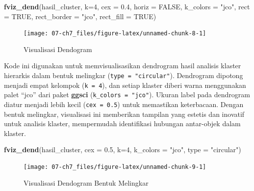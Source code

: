 \documentclass[
  oneside]{book}
\newenvironment{Shaded}{\begin{snugshade}}{\end{snugshade}}
\newcommand{\AttributeTok}[1]{\textcolor[rgb]{0.13,0.29,0.53}{#1}}
\newcommand{\ConstantTok}[1]{\textcolor[rgb]{0.56,0.35,0.01}{#1}}
\newcommand{\DecValTok}[1]{\textcolor[rgb]{0.00,0.00,0.81}{#1}}
\newcommand{\FloatTok}[1]{\textcolor[rgb]{0.00,0.00,0.81}{#1}}
\newcommand{\FunctionTok}[1]{\textcolor[rgb]{0.13,0.29,0.53}{\textbf{#1}}}
\newcommand{\NormalTok}[1]{#1}
\newcommand{\StringTok}[1]{\textcolor[rgb]{0.31,0.60,0.02}{#1}}
\begin{document}
\begin{Shaded}
\begin{Highlighting}[]
\FunctionTok{fviz\_dend}\NormalTok{(hasil\_cluster, }\AttributeTok{k=}\DecValTok{4}\NormalTok{, }\AttributeTok{cex =} \FloatTok{0.4}\NormalTok{, }\AttributeTok{horiz =} \ConstantTok{FALSE}\NormalTok{, }\AttributeTok{k\_colors =} \StringTok{"jco"}\NormalTok{,}
\AttributeTok{rect =} \ConstantTok{TRUE}\NormalTok{, }\AttributeTok{rect\_border =} \StringTok{"jco"}\NormalTok{, }\AttributeTok{rect\_fill =} \ConstantTok{TRUE}\NormalTok{)}
\end{Highlighting}
\end{Shaded}

\begin{figure}[h]

{\centering \texttt{[image: 07-ch7\_files/figure-latex/unnamed-chunk-8-1]} 

}

\caption{Visualisasi Dendogram}\label{fig:unnamed-chunk-8}
\end{figure}

Kode ini digunakan untuk memvisualisasikan dendrogram hasil analisis klaster hierarkis dalam bentuk melingkar (\texttt{type\ =\ "circular"}). Dendrogram dipotong menjadi empat kelompok (\texttt{k\ =\ 4}), dan setiap klaster diberi warna menggunakan palet ``jco'' dari paket \textbf{ggsci} (\texttt{k\_colors\ =\ "jco"}). Ukuran label pada dendrogram diatur menjadi lebih kecil (\texttt{cex\ =\ 0.5}) untuk memastikan keterbacaan. Dengan bentuk melingkar, visualisasi ini memberikan tampilan yang estetis dan inovatif untuk analisis klaster, mempermudah identifikasi hubungan antar-objek dalam klaster.

\begin{Shaded}
\begin{Highlighting}[]
\FunctionTok{fviz\_dend}\NormalTok{(hasil\_cluster, }\AttributeTok{cex =} \FloatTok{0.5}\NormalTok{, }\AttributeTok{k=}\DecValTok{4}\NormalTok{,}
\AttributeTok{k\_colors =} \StringTok{"jco"}\NormalTok{, }\AttributeTok{type =} \StringTok{"circular"}\NormalTok{)}
\end{Highlighting}
\end{Shaded}

\begin{figure}[h]

{\centering \texttt{[image: 07-ch7\_files/figure-latex/unnamed-chunk-9-1]} 

}

\caption{Visualisasi Dendogram Bentuk Melingkar}\label{fig:unnamed-chunk-9}
\end{figure}
\end{document}
